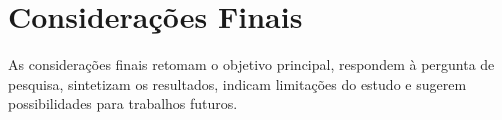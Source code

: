 \section{Considerações Finais}
As considerações finais retomam o objetivo principal, respondem à pergunta de pesquisa, sintetizam os resultados, indicam limitações do estudo e sugerem possibilidades para trabalhos futuros.